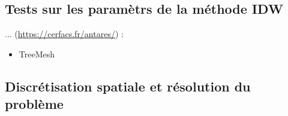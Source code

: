 \subsection{Tests sur les paramètrs de la méthode IDW}




... (\url{https://cerfacs.fr/antares/}) : 


\begin{itemize}
    \item TreeMesh 
\end{itemize}


\subsection{Discrétisation spatiale et résolution du problème}